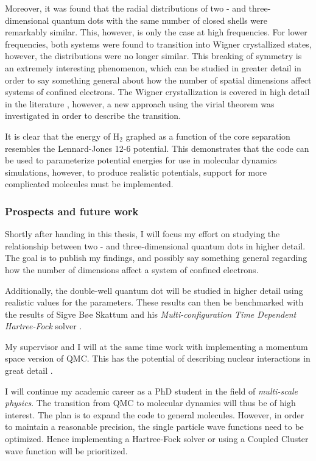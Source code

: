 Moreover, it was found that the radial distributions of two - and three-dimensional quantum dots with the same number of closed shells were remarkably similar. This, however, is only the case at high frequencies. For lower frequencies, both systems were found to transition into Wigner crystallized states, however, the distributions were no longer similar. This breaking of symmetry is an extremely interesting phenomenon, which can be studied in greater detail in order to say something general about how the number of spatial dimensions affect systems of confined electrons. The Wigner crystallization is covered in high detail in the literature \cite{WignerTransport, WignerPathTo, WignerSymmetryBreak, WignerFloating, Wigner2DQD}, however, a new approach using the virial theorem was investigated in order to describe the transition.  

It is clear that the energy of $\mathrm{H_2}$ graphed as a function of the core separation resembles the Lennard-Jones 12-6 potential. This demonstrates that the code can be used to parameterize potential energies for use in molecular dynamics simulations, however, to produce realistic potentials, support for more complicated molecules must be implemented. 

\subsubsection{Prospects and future work}

Shortly after handing in this thesis, I will focus my effort on studying the relationship between two - and three-dimensional quantum dots in higher detail. The goal is to publish my findings, and possibly say something general regarding how the number of dimensions affect a system of confined electrons.

Additionally, the double-well quantum dot will be studied in higher detail using realistic values for the parameters. These results can then be benchmarked with the results of Sigve Bøe Skattum and his \textit{Multi-configuration Time Dependent Hartree-Fock} solver \cite{Sigve}.

My supervisor and I will at the same time work with implementing a momentum space version of QMC. This has the potential of describing nuclear interactions in great detail \cite{momentspaceQMC}. 

I will continue my academic career as a PhD student in the field of \textit{multi-scale physics}. The transition from QMC to molecular dynamics will thus be of high interest. The plan is to expand the code to general molecules. However, in order to maintain a reasonable precision, the single particle wave functions need to be optimized. Hence implementing a Hartree-Fock solver \cite{Shavitt} or using a Coupled Cluster wave function \cite{CCSD_WF} will be prioritized.


